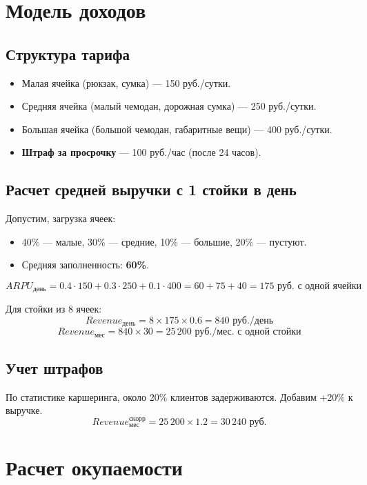 \documentclass[12pt,a4paper]{article}
\begin{document}
\section{Модель доходов}
\subsection{Структура тарифа}
\begin{itemize}
    \item Малая ячейка (рюкзак, сумка) — 150 руб./сутки.
    \item Средняя ячейка (малый чемодан, дорожная сумка) — 250 руб./сутки.
    \item Большая ячейка (большой чемодан, габаритные вещи) — 400 руб./сутки.
    \item \textbf{Штраф за просрочку} — 100 руб./час (после 24 часов).
\end{itemize}

\subsection{Расчет средней выручки с 1 стойки в день}
Допустим, загрузка ячеек:
\begin{itemize}
    \item 40\% — малые, 30\% — средние, 10\% — большие, 20\% — пустуют.
    \item Средняя заполненность: \textbf{60\%}.
\end{itemize}

\begin{equation}
ARPU_{день} = 0.4 \cdot 150 + 0.3 \cdot 250 + 0.1 \cdot 400 = 60 + 75 + 40 = 175 \text{ руб. с одной ячейки}
\end{equation}

Для стойки из 8 ячеек:
\[
Revenue_{день} = 8 \times 175 \times 0.6 = 840 \text{ руб./день}
\]
\[
Revenue_{мес} = 840 \times 30 = 25\,200 \text{ руб./мес. с одной стойки}
\]

\subsection{Учет штрафов }
По статистике каршеринга, около 20\% клиентов задерживаются. Добавим +20\% к выручке.
\[
Revenue_{мес}^{скорр} = 25\,200 \times 1.2 = 30\,240 \text{ руб.}
\]

\section{Расчет окупаемости}
\end{document}
